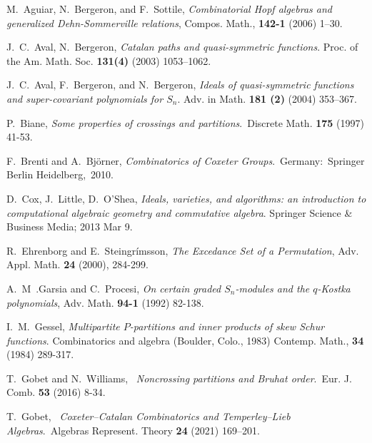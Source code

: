 \documentclass[12pt]{amsart}
\theoremstyle{definition}
\theoremstyle{remark}
\numberwithin{equation}{section}
\begin{document}
\begin{thebibliography}{99}

 M.~Aguiar, N.~Bergeron, and F.~Sottile,
\textit{Combinatorial {H}opf algebras and generalized
              {D}ehn-{S}ommerville relations},
{Compos. Math.},
 {\bf 142-1} (2006) 1--30.


 J.~C.~Aval, N.~Bergeron,
\textit{Catalan paths and quasi-symmetric functions}.
Proc. of the Am. Math. Soc. {\bf 131(4)} (2003) 1053--1062.

 J.~C.~Aval, F.~Bergeron, and N.~Bergeron,
\textit{Ideals of quasi-symmetric functions and super-covariant polynomials for $S_n$}.
Adv. in Math. {\bf 181 (2)} (2004) 353--367.


  P.~Biane, \textit{Some properties of crossings and partitions}. Discrete Math. {\bf 175} (1997) 41-53.

  F.~Brenti and A.~Bj\"{o}rner, \textit{Combinatorics of Coxeter Groups}. Germany: Springer Berlin Heidelberg, 2010.


 D.~Cox, J.~Little, D.~O'Shea,
\textit{Ideals, varieties, and algorithms: an introduction to computational
algebraic geometry and commutative algebra}.
Springer Science \& Business Media; 2013 Mar 9.

 R.~Ehrenborg and E.~Steingr\'{i}msson,
\textit{The Excedance Set of a Permutation},
{Adv. Appl. Math.}
{\bf 24} (2000), 284-299.

 A.~M~.Garsia and C.~Procesi,
\textit{On certain graded {$S_n$}-modules and the {$q$}-{K}ostka
              polynomials},
 {Adv. Math.}
 {\bf 94-1} (1992)  82-138.
 
 I.~M.~Gessel,
\textit{Multipartite {$P$}-partitions and inner products of skew
              {S}chur functions}.
{Combinatorics and algebra ({B}oulder, {C}olo., 1983)} 
{Contemp. Math.}, {\bf 34} (1984)
    289-317.
    
    
  T.~Gobet and N.~Williams,  \textit{Noncrossing partitions and Bruhat order}. Eur. J. Comb. {\bf 53} (2016) 8-34.

  T.~Gobet,  \textit{Coxeter--Catalan Combinatorics and Temperley--Lieb Algebras}. Algebras Represent. Theory {\bf 24} (2021) 169–201.


\end{thebibliography}
\end{document}
